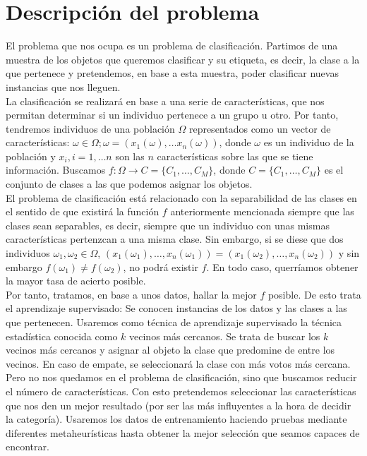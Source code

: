 \documentclass[11pt,leqno]{article}
\begin{document}
\newpage


\tableofcontents
\newpage

\section{Descripción del problema}

El problema que nos ocupa es un problema de clasificación. Partimos de una muestra de los objetos que queremos clasificar y su etiqueta, es decir, la clase a la que pertenece y pretendemos, en base a esta muestra, poder clasificar nuevas instancias que nos lleguen.\\
La clasificación se realizará en base a una serie de características, que nos permitan determinar si un individuo pertenece a un grupo u otro. Por tanto, tendremos individuos de una población $\Omega$ representados como un vector de características: $ \omega \in \Omega; \omega = (x_1(\omega), \dots x_n(\omega))$, donde $\omega$ es un individuo de la población y $x_i, i=1,\dots n$ son las $n$ características sobre las que se tiene información. Buscamos $f:\Omega \longrightarrow C=\{C_1, \dots, C_M\}$, donde $C=\{C_1, \dots, C_M\}$ es el conjunto de clases a las que podemos asignar los objetos.\\
El problema de clasificación está relacionado con la separabilidad de las clases en el sentido de que existirá la función $f$  anteriormente mencionada siempre que las clases sean separables, es decir, siempre que un individuo con unas mismas características pertenzcan a una misma clase. Sin embargo, si se diese que dos individuos $\omega_1, \omega_2 \in \Omega$, $(x_1(\omega_1), \dots, x_n(\omega_1))=(x_1(\omega_2), \dots, x_n(\omega_2))$ y sin embargo $f(\omega_1) \neq f(\omega_2)$, no podrá existir $f$. En todo caso, querríamos obtener la mayor tasa de acierto posible.\\  
Por tanto, tratamos, en base a unos datos, hallar la mejor $f$ posible. De esto trata el aprendizaje supervisado: Se conocen instancias de los datos y las clases a las que pertenecen. Usaremos como técnica de aprendizaje supervisado la técnica estadística conocida como $k$ vecinos más cercanos. Se trata de buscar los $k$ vecinos más cercanos y asignar al objeto la clase que predomine de entre los vecinos. En caso de empate, se seleccionará la clase con más votos más cercana.\\  
Pero no nos quedamos en el problema de clasificación, sino que buscamos reducir el número de características. Con esto pretendemos seleccionar las características que nos den un mejor resultado (por ser las más influyentes a la hora de decidir la categoría). Usaremos los datos de entrenamiento haciendo pruebas mediante diferentes metaheurísticas hasta obtener la mejor selección que seamos capaces de encontrar.\\  
\end{document}
